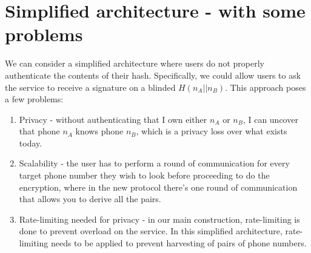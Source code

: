 \documentclass[11pt,letterpaper]{article}
\theoremstyle{definition}
\newcommand{\doclearpage}{%
\iffull
\clearpage
\else
\fi
}
\begin{document}
\appendix

\section{Simplified architecture - with some problems}

We can consider a simplified architecture where users do not properly authenticate the contents of their hash. Specifically, we could allow users to ask the service to receive a signature on a blinded $H(n_A || n_B)$. This approach poses a few problems:

\begin{enumerate}
  \item Privacy - without authenticating that I own either $n_A$ or $n_B$, I can uncover that phone $n_A$ knows phone $n_B$, which is a privacy loss over what exists today.
  \item Scalability - the user has to perform a round of communication for every target phone number they wish to look before proceeding to do the encryption, where in the new protocol there’s one round of communication that allows you to derive all the pairs.
  \item Rate-limiting needed for privacy - in our main construction, rate-limiting is done to prevent overload on the service. In this simplified architecture, rate-limiting needs to be applied to prevent harvesting of pairs of phone numbers.
\end{enumerate}


\doclearpage
\printbibliography
\end{document}
